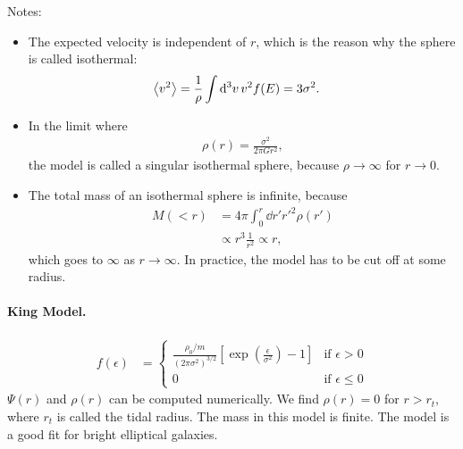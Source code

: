 Notes:
\begin{itemize}
	\item The expected velocity is independent of $r$, which is the reason why the sphere is called isothermal:
	\begin{align*}
		\left\langle v^2 \right\rangle
		&= \frac{1}{\rho} \int \dd{^3v} v^2 f(E)
		= 3 \sigma^2.
	\end{align*}
	\item In the limit where
	\begin{align*}
		\rho(r) = \frac{\sigma^2}{2 \pi G r^2},
	\end{align*}
	the model is called a singular isothermal sphere, because $\rho\to\infty$ for $r \to 0$.
	\item The total mass of an isothermal sphere is infinite, because
	\begin{align*}
		M(<r)
		&= 4 \pi \int_0^r \dd{r'} {r'}^2 \rho(r')\\
		&\propto r^3 \frac{1}{r^2} \propto r,
	\end{align*}
	which goes to $\infty$ as $r \to \infty$. In practice, the model has to be cut off at some radius.
\end{itemize}


\paragraph*{King Model.}
\begin{align*}
	f(\epsilon)
	&=
	\begin{cases}
		\frac{\rho_0/m}{(2 \pi \sigma^2)^{3/2}} \left[ \exp\left( \frac{\epsilon}{\sigma^2} \right) -1 \right]
		& \text{if } \epsilon > 0\\
		0
		& \text{if } \epsilon \leq 0
	\end{cases}
\end{align*}
$\Psi(r)$ and $\rho(r)$ can be computed numerically.
We find $\rho(r) = 0$ for $r > r_t$, where $r_t$ is called the tidal radius.
The mass in this model is finite.
The model is a good fit for bright elliptical galaxies.


